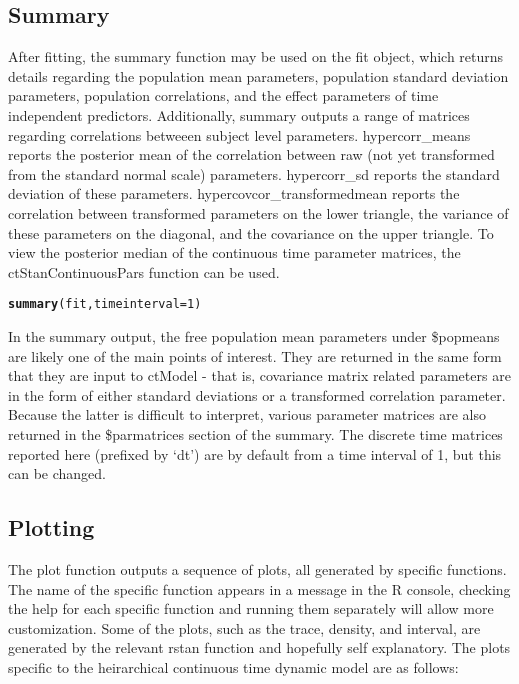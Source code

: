 \documentclass[nojss]{jss}\usepackage[]{graphicx}\usepackage[]{color}
\makeatletter
\newcommand{\hlnum}[1]{\textcolor[rgb]{0.686,0.059,0.569}{#1}}%
\newcommand{\hlstd}[1]{\textcolor[rgb]{0.345,0.345,0.345}{#1}}%
\newcommand{\hlkwc}[1]{\textcolor[rgb]{0.333,0.667,0.333}{#1}}%
\newcommand{\hlkwd}[1]{\textcolor[rgb]{0.737,0.353,0.396}{\textbf{#1}}}%
\newenvironment{kframe}{%
 \def\at@end@of@kframe{}%
 \ifinner\ifhmode%
  \def\at@end@of@kframe{\end{minipage}}%
  \begin{minipage}{\columnwidth}%
 \fi\fi%
 \def\FrameCommand##1{\hskip\@totalleftmargin \hskip-\fboxsep
 \colorbox{shadecolor}{##1}\hskip-\fboxsep
     \hskip-\linewidth \hskip-\@totalleftmargin \hskip\columnwidth}%
 \MakeFramed {\advance\hsize-\width
   \@totalleftmargin\z@ \linewidth\hsize
   \@setminipage}}%
 {\par\unskip\endMakeFramed%
 \at@end@of@kframe}
\newenvironment{knitrout}{}{} %
\makeatother
\begin{document}
\subsection{Summary}
After fitting, the summary function may be used on the fit object, which returns details regarding the population mean parameters, population standard deviation parameters, population correlations, and the effect parameters of time independent predictors. 
Additionally, summary outputs a range of matrices regarding correlations betweeen subject level parameters. hypercorr\_means reports the posterior mean of the correlation between raw (not yet transformed from the standard normal scale) parameters. hypercorr\_sd reports the standard deviation of these parameters. hypercovcor\_transformedmean reports the correlation between transformed parameters on the lower triangle, the variance of these parameters on the diagonal, and the covariance on the upper triangle.
To view the posterior median of the continuous time parameter matrices, the ctStanContinuousPars function can be used.

\begin{knitrout}\small
{}\color{fgcolor}\begin{kframe}
\begin{alltt}
\hlkwd{summary}\hlstd{(fit,}\hlkwc{timeinterval} \hlstd{=} \hlnum{1}\hlstd{)}
\end{alltt}
\end{kframe}
\end{knitrout}

In the summary output, the free population mean parameters under \$popmeans are likely one of the main points of interest. They are returned in the same form that they are input to ctModel - that is, covariance matrix related parameters are in the form of either standard deviations or a transformed correlation parameter. Because the latter is difficult to interpret, various parameter matrices are also returned in the \$parmatrices section of the summary. The discrete time matrices reported here (prefixed by `dt') are by default from a time interval of 1, but this can be changed.

\subsection{Plotting}
The plot function outputs a sequence of plots, all generated by specific functions. The name of the specific function appears in a message in the R console, checking the help for each specific function and running them separately will allow more customization. Some of the plots, such as the trace, density, and interval, are generated by the relevant rstan function and hopefully self explanatory. The plots specific to the heirarchical continuous time dynamic model are as follows:
\end{document}

